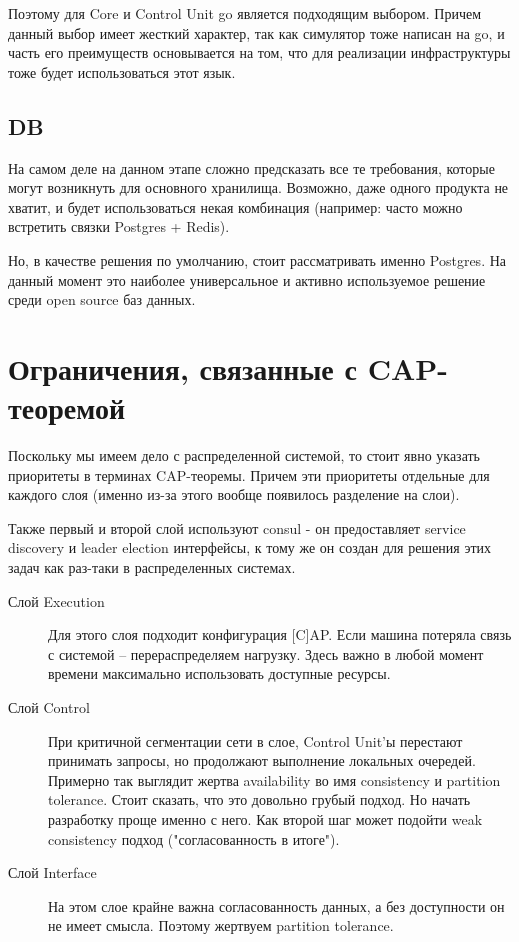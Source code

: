 Поэтому для Core и Control Unit go является подходящим выбором. Причем данный выбор имеет жесткий характер, так как симулятор тоже написан на go, и часть его преимуществ основывается на том, что для реализации инфраструктуры тоже будет использоваться этот язык.

\subsection{DB}

На самом деле на данном этапе сложно предсказать все те требования, которые могут возникнуть для основного хранилища. Возможно, даже одного продукта не хватит, и будет использоваться некая комбинация (например: часто можно встретить связки Postgres + Redis).

Но, в качестве решения по умолчанию, стоит рассматривать именно Postgres. На данный момент это наиболее универсальное и активно используемое решение среди open source баз данных.

\section{Ограничения, связанные с CAP-теоремой}

Поскольку мы имеем дело с распределенной системой, то стоит явно указать приоритеты в терминах CAP-теоремы. Причем эти приоритеты отдельные для каждого слоя (именно из-за этого вообще появилось разделение на слои).

Также первый и второй слой используют consul - он предоставляет service discovery и leader election интерфейсы, к тому же он создан для решения этих задач как раз-таки в распределенных системах.


\begin{description}
  \item[Слой Execution] Для этого слоя подходит конфигурация [C]AP. Если машина потеряла связь с системой -- перераспределяем нагрузку. Здесь важно в любой момент времени максимально использовать доступные ресурсы.
  \item[Слой Control] При критичной сегментации сети в слое, Control Unit'ы перестают принимать запросы, но продолжают выполнение локальных очередей. Примерно так выглядит жертва availability во имя consistency и partition tolerance. Стоит сказать, что это довольно грубый подход. Но начать разработку проще именно с него. Как второй шаг может подойти weak consistency подход ("согласованность в итоге").
  \item[Слой Interface] На этом слое крайне важна согласованность данных, а без доступности он не имеет смысла. Поэтому жертвуем partition tolerance.
\end{description}

